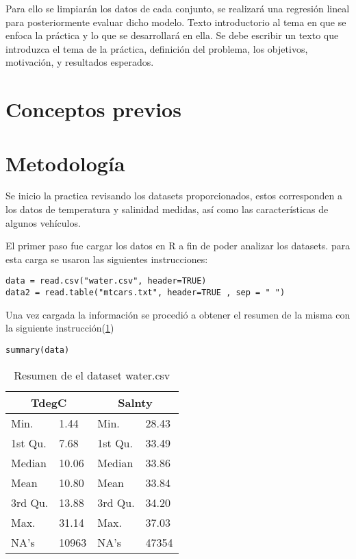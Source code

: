 \documentclass[sigconf]{acmart}
\begin{document}
Para ello se limpiarán los datos de cada conjunto, se realizará una regresión lineal para posteriormente evaluar dicho modelo.
Texto introductorio al tema en que se enfoca la pr{\'a}ctica y lo que se desarrollar{\'a} en ella. Se debe escribir un texto que introduzca el tema de la 
pr{\'a}ctica, definici{\'o}n del problema, los objetivos, motivaci{\'o}n,  y resultados esperados.

\section{Conceptos previos}


\section{Metodología}

Se inicio la practica revisando los datasets proporcionados, estos corresponden a los datos de temperatura y salinidad medidas, así como las características de algunos vehículos. 

El primer paso fue cargar los datos en R a fin de poder analizar los datasets. para esta carga se usaron las siguientes instrucciones:

\begin{lstlisting}[caption=lectura de los datos]
data = read.csv("water.csv", header=TRUE)
data2 = read.table("mtcars.txt", header=TRUE , sep = " ")
\end{lstlisting}

Una vez cargada la información se procedió a obtener el resumen de la misma con la siguiente instrucción(\ref{tab:Tabla1})

\begin{lstlisting}
summary(data)
\end{lstlisting}

\begin{table}
	\begin{tabularx}{\columnwidth}{|X|X|X|X|}
		\hline
		\multicolumn{2}{|c|}{ TdegC } & \multicolumn{2}{|c|}{ Salnty }  \\
		\hline
	Min. & 1.44  & Min. & 28.43 \\
		\hline
	1st Qu.& 7.68 &1st Qu.&33.49 \\
		\hline
	Median &10.06  & Median & 33.86   \\
		\hline
	Mean & 10.80 & Mean & 33.84\\
		\hline
	3rd Qu.&13.88 & 3rd Qu. & 34.20\\
		\hline
	Max. & 31.14 & Max.& 37.03  \\
		\hline
	NA's & 10963 & NA's  & 47354\\
		\hline
	\end{tabularx}
	\caption{\label{tab:Tabla1}Resumen de el dataset water.csv}
\end{table}
\end{document}
